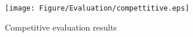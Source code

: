 \begin{comment}
\subsubsection{AlpacaEval}
First, we evaluate the models on AlpacaEval~\cite{alpacaeval}. AlpacaEval is an
automatic evaluator designed for instruction-following language models. It provides
a quick, cost-effective, and high-quality way to assess these models by generating a
leaderboard and annotations for model outputs. AlpacaEval uses advanced
configurations and annotators to ensure a high agreement rate with human annotations,
making it a reliable tool for evaluating the performance of language models across
various tasks.

\subsubsection{MMLU}
First, we evaluate the models on AlpacaEval~\cite{alpacaeval}. AlpacaEval is an
automatic evaluator designed for instruction-following language models. It provides
a quick, cost-effective, and high-quality way to assess these models by generating a
leaderboard and annotations for model outputs. AlpacaEval uses advanced
configurations and annotators to ensure a high agreement rate with human annotations,
making it a reliable tool for evaluating the performance of language models across
various tasks.
\end{comment}


\begin{figure}[t]
    \centering
    \texttt{[image: Figure/Evaluation/compettitive.eps]}
    \caption{Competitive evaluation results}
    \label{fig:competitive}
\end{figure}

